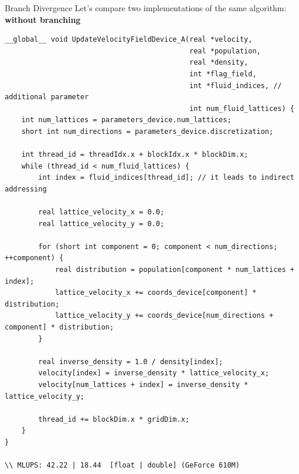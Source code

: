\documentclass[9pt]{beamer}
\begin{document}
\begin{frame}[fragile, t]{Branch Divergence }
Let's compare two implementations of the same algorithm: \textbf{without branching} 
\begin{scriptsize}
\begin{lstlisting}
__global__ void UpdateVelocityFieldDevice_A(real *velocity,
                                            real *population,
                                            real *density,
                                            int *flag_field,
                                            int *fluid_indices, // additional parameter
                                            int num_fluid_lattices) {
    int num_lattices = parameters_device.num_lattices;
    short int num_directions = parameters_device.discretization; 
    
    int thread_id = threadIdx.x + blockIdx.x * blockDim.x;
    while (thread_id < num_fluid_lattices) {
        int index = fluid_indices[thread_id]; // it leads to indirect addressing
        
        real lattice_velocity_x = 0.0;
        real lattice_velocity_y = 0.0;
            
        for (short int component = 0; component < num_directions; ++component) {
            real distribution = population[component * num_lattices + index];
            lattice_velocity_x += coords_device[component] * distribution;
            lattice_velocity_y += coords_device[num_directions + component] * distribution;
        }

        real inverse_density = 1.0 / density[index];
        velocity[index] = inverse_density * lattice_velocity_x;
        velocity[num_lattices + index] = inverse_density * lattice_velocity_y;
        
        thread_id += blockDim.x * gridDim.x; 
    }
}

\\ MLUPS: 42.22 | 18.44  [float | double] (GeForce 610M)
\end{lstlisting}
\end{scriptsize}
\end{frame}
\end{document}
